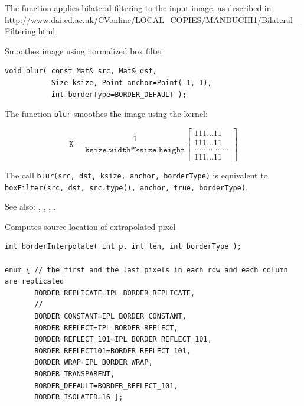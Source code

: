 The function applies bilateral filtering to the input image, as described in
\url{http://www.dai.ed.ac.uk/CVonline/LOCAL\_COPIES/MANDUCHI1/Bilateral\_Filtering.html}

\label{blur}
Smoothes image using normalized box filter

\begin{lstlisting}
void blur( const Mat& src, Mat& dst,
           Size ksize, Point anchor=Point(-1,-1),
           int borderType=BORDER_DEFAULT );
\end{lstlisting}
\begin{description}
\end{description}

The function \texttt{blur} smoothes the image using the kernel:

\[ \texttt{K} = \frac{1}{\texttt{ksize.width*ksize.height}}
\begin{bmatrix}
1 1 1 ... 1 1 \\
1 1 1 ... 1 1 \\
............... \\
1 1 1 ... 1 1
\end{bmatrix}
\]

The call \texttt{blur(src, dst, ksize, anchor, borderType)} is equivalent to
\texttt{boxFilter(src, dst, src.type(), anchor, true, borderType)}.

See also: , , , .

\label{borderInterpolate}
Computes source location of extrapolated pixel

\begin{lstlisting}
int borderInterpolate( int p, int len, int borderType );

enum { // the first and the last pixels in each row and each column are replicated
       BORDER_REPLICATE=IPL_BORDER_REPLICATE,
       // 
       BORDER_CONSTANT=IPL_BORDER_CONSTANT,
       BORDER_REFLECT=IPL_BORDER_REFLECT,
       BORDER_REFLECT_101=IPL_BORDER_REFLECT_101,
       BORDER_REFLECT101=BORDER_REFLECT_101,
       BORDER_WRAP=IPL_BORDER_WRAP,
       BORDER_TRANSPARENT,
       BORDER_DEFAULT=BORDER_REFLECT_101,
       BORDER_ISOLATED=16 };
\end{lstlisting}
\begin{description}
\end{description}


